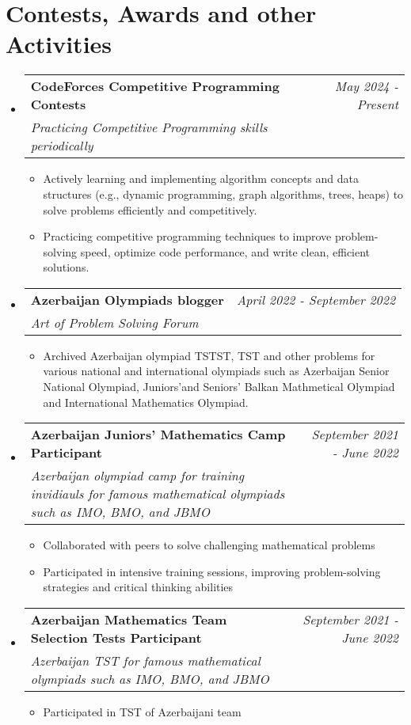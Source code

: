 \documentclass[a4paper,11pt]{article}
\makeatletter
\newcommand{\resumeProject}[4]{
    \vspace{0.5mm}
\item
    \begin{tabular*}{0.98\textwidth}[t]{l@{\extracolsep{\fill}}r}
        \textbf{#1} & \textit{\footnotesize{#3}} \\
        \footnotesize{\textit{#2}} & \footnotesize{#4}
    \end{tabular*}
    \vspace{-2.4mm}
}
\newcommand{\resumeSubHeadingListStart}{
\begin{itemize}[leftmargin=*,labelsep=1mm]}
\newcommand{\resumeItemListStart}{
                \begin{itemize}[leftmargin=*,labelsep=1mm,itemsep=0.5mm]}
\newcommand{\resumeSubHeadingListEnd}{
                    \end{itemize}\vspace{2mm}}
\newcommand{\resumeItemListEnd}{
    \end{itemize}\vspace{-2mm}}
\makeatother
\begin{document}
\section{\textbf{Contests, Awards and other Activities}}
\vspace{-0.4mm}
\resumeSubHeadingListStart
\resumeProject
{CodeForces Competitive Programming Contests}
{Practicing Competitive Programming skills periodically}
{May 2024 - Present}
{{}\href{https://codeforces.com/profile/JosephMehdiyev}{\textcolor{darkblue}{\faIcon{globe}}}}

\resumeItemListStart
\item Actively learning and implementing algorithm concepts and data structures (e.g., dynamic programming, graph algorithms, trees, heaps)
to solve problems efficiently and competitively.
\item Practicing competitive programming techniques to improve problem-solving speed, optimize code performance, and write clean, efficient solutions.
\resumeItemListEnd

\resumeProject
{Azerbaijan Olympiads blogger}
{Art of Problem Solving Forum}
{April 2022 - September 2022}
{{}\href{https://artofproblemsolving.com/community/user/948405}{\textcolor{darkblue}{\faIcon{globe}}}}

\resumeItemListStart
\item Archived Azerbaijan olympiad TSTST, TST and other problems for various national and international olympiads such as Azerbaijan Senior
National Olympiad, Juniors'and Seniors' Balkan Mathmetical Olympiad and International Mathematics Olympiad.
\resumeItemListEnd

\resumeProject
{Azerbaijan Juniors' Mathematics Camp Participant}
{Azerbaijan olympiad camp for training invidiauls for famous mathematical olympiads such as IMO, BMO, and JBMO}
{September 2021 - June 2022}
{}
\resumeItemListStart
\item Collaborated with peers to solve challenging mathematical problems
\item Participated in intensive training sessions, improving problem-solving strategies and critical thinking abilities

\resumeItemListEnd
\resumeProject
{Azerbaijan Mathematics Team Selection Tests Participant}
{Azerbaijan TST for famous mathematical olympiads such as IMO, BMO, and JBMO}
{September 2021 - June 2022}
{}
\resumeItemListStart
\item Participated in TST of Azerbaijani team
\resumeItemListEnd
\resumeSubHeadingListEnd
\vspace{-6mm}
\end{document}

